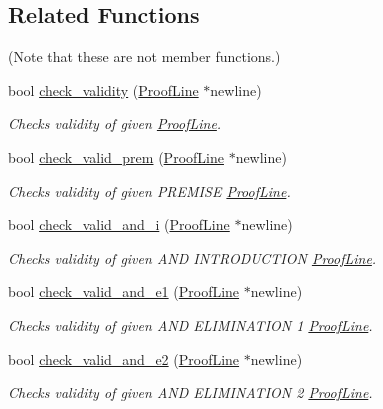 \subsection*{Related Functions}
(Note that these are not member functions.) \begin{DoxyCompactItemize}
\item 
bool \mbox{\hyperlink{classProofLine_ad34f3b0deb1e94d6b1c44a2de9680972}{check\+\_\+validity}} (\mbox{\hyperlink{classProofLine}{Proof\+Line}} $\ast$newline)
\begin{DoxyCompactList}\small\item\em Checks validity of given \mbox{\hyperlink{classProofLine}{Proof\+Line}}. \end{DoxyCompactList}\item 
bool \mbox{\hyperlink{classProofLine_a3d9c86a35ee3da94e663c41d40ff279b}{check\+\_\+valid\+\_\+prem}} (\mbox{\hyperlink{classProofLine}{Proof\+Line}} $\ast$newline)
\begin{DoxyCompactList}\small\item\em Checks validity of given P\+R\+E\+M\+I\+SE \mbox{\hyperlink{classProofLine}{Proof\+Line}}. \end{DoxyCompactList}\item 
bool \mbox{\hyperlink{classProofLine_a118aab7800af68c5b32fa5e103c75741}{check\+\_\+valid\+\_\+and\+\_\+i}} (\mbox{\hyperlink{classProofLine}{Proof\+Line}} $\ast$newline)
\begin{DoxyCompactList}\small\item\em Checks validity of given A\+ND I\+N\+T\+R\+O\+D\+U\+C\+T\+I\+ON \mbox{\hyperlink{classProofLine}{Proof\+Line}}. \end{DoxyCompactList}\item 
bool \mbox{\hyperlink{classProofLine_abdc10668ade35c80f0fd187c837e1a77}{check\+\_\+valid\+\_\+and\+\_\+e1}} (\mbox{\hyperlink{classProofLine}{Proof\+Line}} $\ast$newline)
\begin{DoxyCompactList}\small\item\em Checks validity of given A\+ND E\+L\+I\+M\+I\+N\+A\+T\+I\+ON 1 \mbox{\hyperlink{classProofLine}{Proof\+Line}}. \end{DoxyCompactList}\item 
bool \mbox{\hyperlink{classProofLine_add6d4592664b8ce7ed7e02f8f76a9a2a}{check\+\_\+valid\+\_\+and\+\_\+e2}} (\mbox{\hyperlink{classProofLine}{Proof\+Line}} $\ast$newline)
\begin{DoxyCompactList}\small\item\em Checks validity of given A\+ND E\+L\+I\+M\+I\+N\+A\+T\+I\+ON 2 \mbox{\hyperlink{classProofLine}{Proof\+Line}}. \end{DoxyCompactList}\item 

\end{DoxyCompactItemize}
